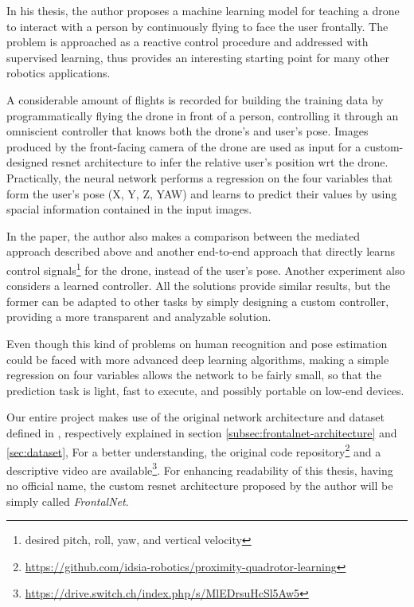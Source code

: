 \medskip

In his thesis, the author proposes a machine learning model for teaching a drone to interact with a person by continuously flying to face the user frontally. The problem is approached as a reactive control procedure and addressed with supervised learning, thus provides an interesting starting point for many other robotics applications. 

A considerable amount of flights is recorded for building the training data by programmatically flying the drone in front of a person, controlling it through an omniscient controller that knows both the drone's and user's pose. Images produced by the front-facing camera of the drone are used as input for a custom-designed \gls{resnet} architecture to infer the relative user's position \gls{wrt} the drone. Practically, the neural network performs a regression on the four variables that form the user's pose (X, Y, Z, YAW) and learns to predict their values by using spacial information contained in the input images. 

In the paper, the author also makes a comparison between the mediated approach described above and another end-to-end approach that directly learns control signals\footnote{desired pitch, roll, yaw, and vertical velocity} for the drone, instead of the user's pose. Another experiment also considers a learned controller. All the solutions provide similar results, but the former can be adapted to other tasks by simply designing a custom controller, providing a more transparent and analyzable solution.

\medskip

Even though this kind of problems on human recognition and pose estimation could be faced with more advanced deep learning algorithms, making a simple regression on four variables allows the network to be fairly small, so that the prediction task is light, fast to execute, and possibly portable on low-end devices.

\bigskip

Our entire project makes use of the original network architecture and dataset defined in \cite{mantegazza2019visionbased}, respectively explained in section \ref{subsec:frontalnet-architecture} and \ref{sec:dataset}, For a better understanding, the original code repository\footnote{\url{https://github.com/idsia-robotics/proximity-quadrotor-learning}} and a descriptive video are available\footnote{\url{https://drive.switch.ch/index.php/s/MlEDrsuHcSl5Aw5}}. 
For enhancing readability of this thesis, having no official name, the custom \gls{resnet} architecture proposed by the author will be simply called \textit{FrontalNet}.



